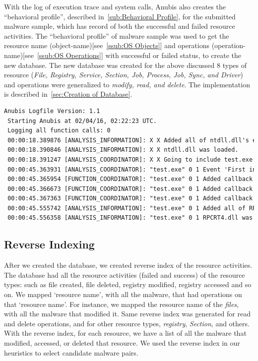 With the log of execution trace and system calls, Anubis also creates the ``behavioral profile'', described in~\autoref{sub:Behavioral Profile}, for the submitted malware sample, which has record of both the successful and failed resource activities.
The ``behavioral profile'' of malware sample was used to get the resource name (object-name)[see~\autoref{ssub:OS Objects}] and operations (operation-name)[see~\autoref{ssub:OS Operations}] with successful or failed status, to create the new database.
The new database was created for the above discussed 8 types of resource (\emph{File, Registry, Service, Section, Job, Process, Job, Sync, and Driver}) and operations were generalized to \emph{modify, read, and delete}.
The implementation is described in~\autoref{sec:Creation of Database}.
\begin{lstlisting}[float,floatplacement=ht,language=TeX,caption={Snippet of Anubis Log},label={lst:anubislog}]
 Anubis Logfile Version: 1.1
 Starting Anubis at 02/04/16, 02:22:23 UTC.
 Logging all function calls: 0
 00:00:18.389876 [ANALYSIS_INFORMATION]: X X Added all of ntdll.dll's exported functions to the function Addresses Map.
 00:00:18.390846 [ANALYSIS_INFORMATION]: X X ntdll.dll was loaded.
 00:00:18.391247 [ANALYSIS_COORDINATOR]: X X Going to include test.exe with PDB 0x04660000 in the analysis.
 00:00:45.363931 [ANALYSIS_COORDINATOR]: "test.exe" 0 1 Event 'First instruction of the process' happened.
 00:00:45.365954 [FUNCTION_COORDINATOR]: "test.exe" 0 1 Added callback for function NtOpenKey (7C90D5B0)
 00:00:45.366673 [FUNCTION_COORDINATOR]: "test.exe" 0 1 Added callback for function NtDeleteKey (7C90D230)
 00:00:45.367363 [FUNCTION_COORDINATOR]: "test.exe" 0 1 Added callback for function NtCreateKey (7C90D0D0)
 00:00:45.555742 [ANALYSIS_INFORMATION]: "test.exe" 0 1 Added all of RPCRT4.dll's exported functions to the function Addresses Map.
 00:00:45.556358 [ANALYSIS_INFORMATION]: "test.exe" 0 1 RPCRT4.dll was loaded.
\end{lstlisting}
\subsection{Reverse Indexing}
\label{sub:Reverse Indexing}
After we created the database, we created reverse index of the resource activities.
The database had all the resource activities (failed and success) of the resource types: such as file created, file deleted, registry modified, registry accessed and so on.
We mapped `resource name', with all the malware, that had operations on that `resource name'.
For instance, we mapped the resource name of the \emph{files}, with all the malware that modified it.
Same reverse index was generated for read and delete operations, and for other resource types, \emph{registry}, \emph{Section}, and others.
With the reverse index, for each resource, we have a list of all the malware that modified, accessed, or deleted that resource.
We used the reverse index in our heuristics to select candidate malware pairs.
